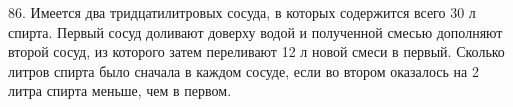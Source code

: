 86. Имеется два тридцатилитровых сосуда, в которых
содержится всего 30 л спирта. Первый сосуд доливают
доверху водой и полученной смесью дополняют второй
сосуд, из которого затем переливают 12 л новой смеси в
первый. Сколько литров спирта было сначала в каждом
сосуде, если во втором оказалось на 2 литра спирта
меньше, чем в первом.\\
